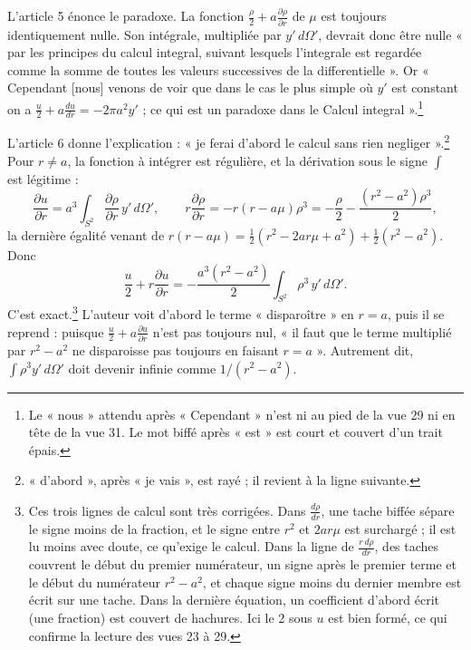 \documentclass[11pt,a4paper]{article}
\begin{document}
L'article 5 énonce le paradoxe. La fonction \(\frac\rho2+a\frac{\partial
\rho}{\partial r}\) de \(\mu\) est toujours identiquement nulle. Son intégrale,
multipliée par \(y'\,d\Omega'\), devrait donc être nulle « par les principes du
calcul integral, suivant lesquels l'integrale est regardée comme la somme de
toutes les valeurs successives de la differentielle ». Or « Cependant [nous]
venons de voir que dans le cas le plus simple où \(y'\) est constant on a
\(\frac u2+a\frac{du}{dr}=-2\pi a^2y'\) ; ce qui est un paradoxe dans le Calcul
integral ».\footnote{Le « nous » attendu après « Cependant » n'est ni au pied
de la vue 29 ni en tête de la vue 31. Le mot biffé après « est » est court et
couvert d'un trait épais.}

L'article 6 donne l'explication : « je ferai d'abord le calcul sans rien
negliger ».\footnote{« d'abord », après « je vais », est rayé ; il revient à la
ligne suivante.} Pour \(r\ne a\), la fonction à intégrer est régulière, et la
dérivation sous le signe \(\int\) est légitime :
\[
\frac{\partial u}{\partial r}=a^3\int_{S^2}\frac{\partial\rho}{\partial r}\,y'\,d\Omega',
\qquad
r\frac{\partial\rho}{\partial r}=-r(r-a\mu)\rho^3=-\frac\rho2-\frac{(r^2-a^2)\rho^3}{2},
\]
la dernière égalité venant de \(r(r-a\mu)=\frac12(r^2-2ar\mu+a^2)+\frac12(r^2-a^2)\).
Donc
\[
\frac u2+r\frac{\partial u}{\partial r}=-\frac{a^3(r^2-a^2)}{2}\int_{S^2}\rho^3\,y'\,d\Omega' .
\]
C'est exact.\footnote{Ces trois lignes de calcul sont très corrigées. Dans
\(\frac{d\rho}{dr}\), une tache biffée sépare le signe moins de la fraction, et
le signe entre \(r^2\) et \(2ar\mu\) est surchargé ; il est lu moins avec
doute, ce qu'exige le calcul. Dans la ligne de \(\frac{r\,d\rho}{dr}\), des
taches couvrent le début du premier numérateur, un signe après le premier
terme et le début du numérateur \(r^2-a^2\), et chaque signe moins du dernier
membre est écrit sur une tache. Dans la dernière équation, un coefficient
d'abord écrit (une fraction) est couvert de hachures. Ici le 2 sous \(u\) est
bien formé, ce qui confirme la lecture des vues 23 à 29.} L'auteur voit
d'abord le terme « disparoître » en \(r=a\), puis il se reprend : puisque
\(\frac u2+a\frac{\partial u}{\partial r}\) n'est pas toujours nul, « il faut
que le terme multiplié par \(r^2-a^2\) ne disparoisse pas toujours en faisant
\(r=a\) ». Autrement dit, \(\int\rho^3y'\,d\Omega'\) doit devenir infinie comme
\(1/(r^2-a^2)\).
\end{document}

